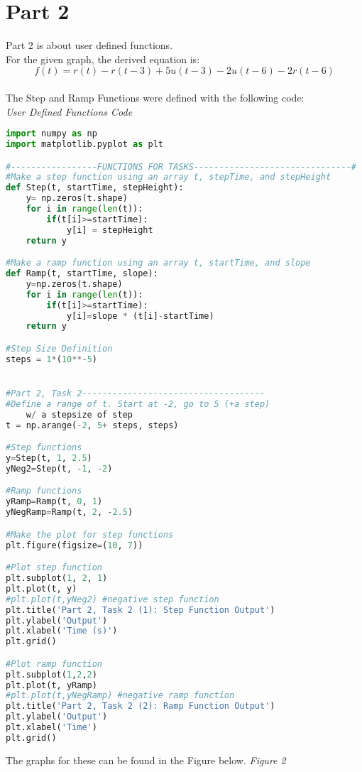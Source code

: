\documentclass[12pt,a4paper]{article}
\begin{document}
\section{Part 2}\label{sec:intro}
Part 2 is about user defined functions.\\
For the given graph, the derived equation is:  $$f(t)=r(t)-r(t-3)+5u(t-3)-2u(t-6)-2r(t-6)$$
\\
The Step and Ramp Functions were defined with the following code:
\\
\textit{User Defined Functions Code}
\begin{lstlisting}[language=Python]
    import numpy as np
import matplotlib.pyplot as plt

#-----------------FUNCTIONS FOR TASKS-------------------------------#
#Make a step function using an array t, stepTime, and stepHeight
def Step(t, startTime, stepHeight):
    y= np.zeros(t.shape)
    for i in range(len(t)):
        if(t[i]>=startTime):
            y[i] = stepHeight
    return y

#Make a ramp function using an array t, startTime, and slope
def Ramp(t, startTime, slope):
    y=np.zeros(t.shape)
    for i in range(len(t)):
        if(t[i]>=startTime):
            y[i]=slope * (t[i]-startTime)
    return y

#Step Size Definition
steps = 1*(10**-5)


#Part 2, Task 2------------------------------------
#Define a range of t. Start at -2, go to 5 (+a step) 
    w/ a stepsize of step
t = np.arange(-2, 5+ steps, steps)

#Step functions
y=Step(t, 1, 2.5)
yNeg2=Step(t, -1, -2)

#Ramp functions
yRamp=Ramp(t, 0, 1)
yNegRamp=Ramp(t, 2, -2.5)

#Make the plot for step functions
plt.figure(figsize=(10, 7))

#Plot step function
plt.subplot(1, 2, 1)
plt.plot(t, y)
#plt.plot(t,yNeg2) #negative step function
plt.title('Part 2, Task 2 (1): Step Function Output')
plt.ylabel('Output')
plt.xlabel('Time (s)')
plt.grid()

#Plot ramp function
plt.subplot(1,2,2)
plt.plot(t, yRamp)
#plt.plot(t,yNegRamp) #negative ramp function
plt.title('Part 2, Task 2 (2): Ramp Function Output')
plt.ylabel('Output')
plt.xlabel('Time')
plt.grid()

\end{lstlisting}
The graphs for these can be found in the Figure below.
\textit{Figure 2}\\
\end{document}
